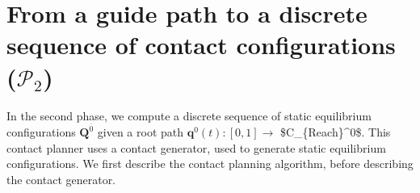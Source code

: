 \section{From a guide path to a discrete sequence of contact configurations ($\mathcal{P}_2$)}
\label{sec:contact}
In the second phase, we compute a discrete sequence of static equilibrium configurations $\mathbf{Q}^{\overline{0}}$ given a root path
$\mathbf{q}^0(t) : [0,1] \longrightarrow$ \gls{$C_{Reach}^0$}. This contact planner uses a contact generator, used to generate static equilibrium configurations. We first describe the contact planning algorithm, before describing
the contact generator.




